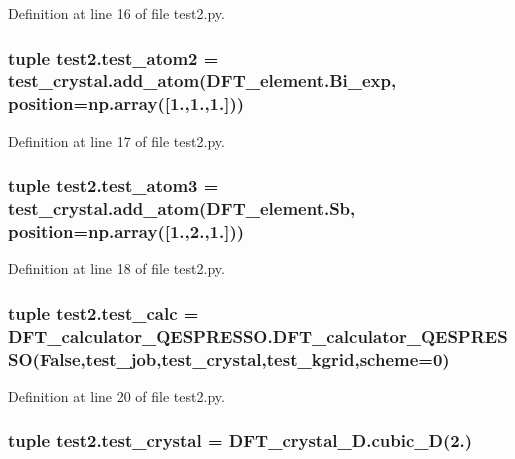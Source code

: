 Definition at line 16 of file test2.\+py.

\hypertarget{namespacetest2_aa91ed76e9a11db879c0f08f013ba6280}{
\subsubsection[{test\+\_\+atom2}]{\setlength{\rightskip}{0pt plus 5cm}tuple test2.\+test\+\_\+atom2 = test\+\_\+crystal.\+add\+\_\+atom(D\+F\+T\+\_\+element.\+Bi\+\_\+exp, position=np.\+array(\mbox{[}1.,1.,1.\mbox{]}))}}\label{namespacetest2_aa91ed76e9a11db879c0f08f013ba6280}


Definition at line 17 of file test2.\+py.

\hypertarget{namespacetest2_a186bceb4dd12340645a99dfdc5b6f8eb}{
\subsubsection[{test\+\_\+atom3}]{\setlength{\rightskip}{0pt plus 5cm}tuple test2.\+test\+\_\+atom3 = test\+\_\+crystal.\+add\+\_\+atom(D\+F\+T\+\_\+element.\+Sb, position=np.\+array(\mbox{[}1.,2.,1.\mbox{]}))}}\label{namespacetest2_a186bceb4dd12340645a99dfdc5b6f8eb}


Definition at line 18 of file test2.\+py.

\hypertarget{namespacetest2_a57918f605bcac36d83fb025476490d52}{
\subsubsection[{test\+\_\+calc}]{\setlength{\rightskip}{0pt plus 5cm}tuple test2.\+test\+\_\+calc = D\+F\+T\+\_\+calculator\+\_\+\+Q\+E\+S\+P\+R\+E\+S\+S\+O.\+D\+F\+T\+\_\+calculator\+\_\+\+Q\+E\+S\+P\+R\+E\+S\+S\+O(False,{\bf test\+\_\+job},{\bf test\+\_\+crystal},{\bf test\+\_\+kgrid},scheme=0)}}\label{namespacetest2_a57918f605bcac36d83fb025476490d52}


Definition at line 20 of file test2.\+py.

\hypertarget{namespacetest2_a2e79ec3af6460f90aec23c3b7d0f18ba}{
\subsubsection[{test\+\_\+crystal}]{\setlength{\rightskip}{0pt plus 5cm}tuple test2.\+test\+\_\+crystal = D\+F\+T\+\_\+crystal\+\_\+D.\+cubic\+\_\+D(2.)}}\label{namespacetest2_a2e79ec3af6460f90aec23c3b7d0f18ba}


